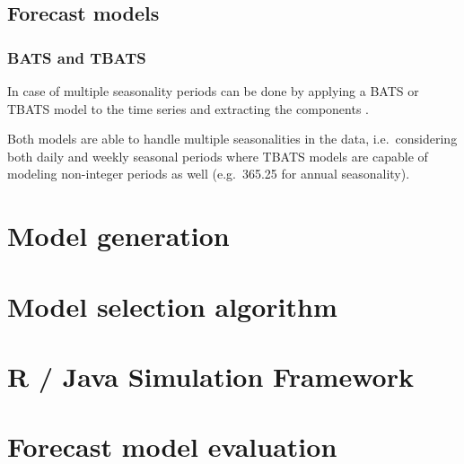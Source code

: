 \subsection{Forecast models}

\subsubsection{BATS and TBATS}

In case of multiple seasonality periods can be done by applying a BATS or TBATS model to the time series and extracting the components \cite{de2011forecasting}. 

Both models are able to handle multiple seasonalities in the data, i.e.~considering both daily and weekly seasonal periods where TBATS models are capable of modeling non-integer periods as well (e.g.~365.25 for annual seasonality). 











\section{Model generation}





\section{Model selection algorithm}



\section{R / Java Simulation Framework}



\section{Forecast model evaluation}











